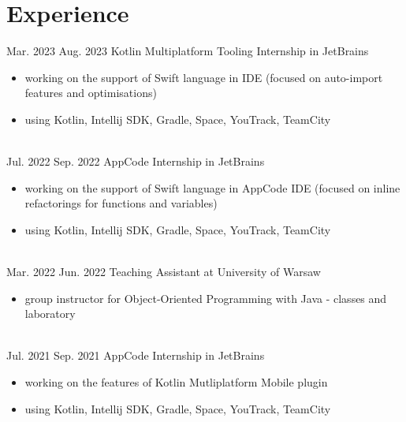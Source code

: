 \documentclass[a4paper]{twentysecondcv} %
\begin{document}
    \makeprofile %

    \vspace{-0.3cm}


    \section{Experience}
    \begin{twenty}
        \twentyitem
        {Mar. 2023}
        {Aug. 2023}
        {Kotlin Multiplatform Tooling Internship in JetBrains}
        {}
        {}
        {\begin{itemize}
             \item working on the support of Swift language in IDE (focused on auto-import features and optimisations)
             \item using Kotlin, Intellij SDK, Gradle, Space, YouTrack, TeamCity
        \end{itemize}
        }
        \\
        \twentyitem
        {Jul. 2022}
        {Sep. 2022}
        {AppCode Internship in JetBrains}
        {}
        {}
        {\begin{itemize}
             \item working on the support of Swift language in AppCode IDE (focused on inline refactorings for functions and variables)
             \item using Kotlin, Intellij SDK, Gradle, Space, YouTrack, TeamCity
        \end{itemize}
        }
        \\
        \twentyitem
        {Mar. 2022}
        {Jun. 2022}
        {Teaching Assistant at University of Warsaw}
        {}
        {}
        {\begin{itemize}
             \item group instructor for Object-Oriented Programming with Java - classes and laboratory
        \end{itemize}
        }
        \\
        \twentyitem
        {Jul. 2021}
        {Sep. 2021}
        {AppCode Internship in JetBrains}
        {}
        {}
        {\begin{itemize}
             \item working on the features of Kotlin Mutliplatform Mobile plugin
             \item using Kotlin, Intellij SDK, Gradle, Space, YouTrack, TeamCity
        \end{itemize}
}
\end{twenty}
\end{document}
